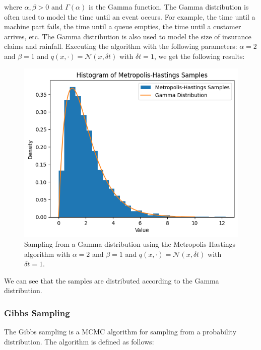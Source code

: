 \documentclass{article}
\begin{document}
where $\alpha, \beta > 0$ and $\Gamma(\alpha)$ is the Gamma function. The Gamma distribution is often used to model the time until an event occurs. For example, the time until a machine part fails, the time until a queue empties, the time until a customer arrives, etc. The Gamma distribution is also used to model the size of insurance claims and rainfall. Executing the algorithm with the following parameters: $\alpha = 2$ and $\beta = 1$ and $q(x, \cdot) = \mathcal{N}(x, \delta t)$ with $\delta t = 1$, we get the following results:

\begin{figure}[H]
	\centering
	\includegraphics[width=0.5\linewidth]{./Figures/MCMC/gamma.png}
	\caption{Sampling from a Gamma distribution using the Metropolis-Hastings algorithm with $\alpha = 2$ and $\beta = 1$ and $q(x, \cdot) = \mathcal{N}(x, \delta t)$ with $\delta t = 1$.}
	\label{fig:gamma}
\end{figure}

We can see that the samples are distributed according to the Gamma distribution.


\subsubsection{Gibbs Sampling}

The Gibbs sampling is a MCMC algorithm for sampling from a probability distribution. The algorithm is defined as follows:
\end{document}
